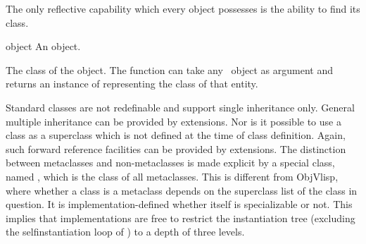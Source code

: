 %
\begin{optDefinition}
\noindent
The only reflective capability which every object possesses is the ability to
find its class.

%
\begin{arguments}
    \item[object] An object.
\end{arguments}
%
\result%
The class of the object.
%
\remarks%
The function  can take any \lisp\ object as argument and
returns an instance of  representing the class of that entity.
%
\end{optDefinition}

%
\begin{optDefinition}
\noindent
Standard classes are not redefinable and support single inheritance only.
General multiple inheritance can be provided by extensions.  Nor is it possible
to use a class as a superclass which is not defined at the time of class
definition.  Again, such forward reference facilities can be provided by
extensions. The distinction between metaclasses and non-metaclasses is made
explicit by a special class, named , which is the class of
all metaclasses. This is different from ObjVlisp, where whether a class is a
metaclass depends on the superclass list of the class in question.  It is
implementation-defined whether  itself is specializable or
not. This implies that implementations are free to restrict the instantiation
tree (excluding the selfinstantiation loop of ) to a depth
of three levels.


\end{optDefinition}
